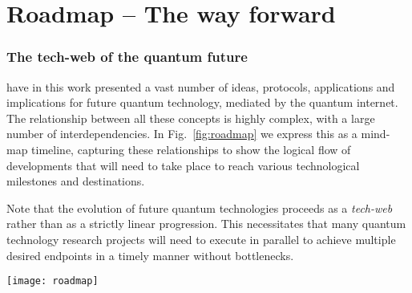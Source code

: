 %
%

\part{Roadmap -- The way forward}

\section{The tech-web of the quantum future}

 have in this work presented a vast number of ideas, protocols, applications and implications for future quantum technology, mediated by the quantum internet. The relationship between all these concepts is highly complex, with a large number of interdependencies. In Fig.~\ref{fig:roadmap} we express this as a mind-map timeline, capturing these relationships to show the logical flow of developments that will need to take place to reach various technological milestones and destinations.

Note that the evolution of future quantum technologies proceeds as a \textit{tech-web} rather than as a strictly linear progression. This necessitates that many quantum technology research projects will need to execute in parallel to achieve multiple desired endpoints in a timely manner without bottlenecks.

\begin{figure*}
	\texttt{[image: roadmap]}
	\caption{Relationships and dependencies in the development and deployment of the major concepts in the quantum internet -- the quantum \textit{tech-web} -- showing the logical flow of developments that will need to take place to reach various technological milestones and destinations. The progression is highly non-linear, mandating many research programs operating in parallel to prevent technology bottlenecks.}\label{fig:roadmap}
\end{figure*}
